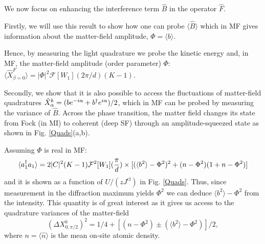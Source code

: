 We now focus on enhancing the interference term $\hat{B}$ in the
operator $\hat{F}$. 

Firstly, we will use this result to show how one can probe
$\langle \hat{B} \rangle$ which in MF gives information about the
matter-field amplitude, $\Phi = \langle b \rangle$. 

Hence, by measuring the light quadrature we probe the kinetic energy
and, in MF, the matter-field amplitude (order parameter) $\Phi$:
$\langle \hat{X}^F_{\beta=0} \rangle = | \Phi |^2
\mathcal{F}[W_1](2\pi/d) (K-1)$.

Secondly, we show that it is also possible to access the fluctuations
of matter-field quadratures $\hat{X}^b_\alpha = (b e^{-i\alpha} + b^\dagger
e^{i\alpha})/2$, which in MF can be probed by measuring the variance
of $\hat{B}$. Across the phase transition, the matter field changes
its state from Fock (in MI) to coherent (deep SF) through an
amplitude-squeezed state as shown in Fig. \ref{Quads}(a,b). 

Assuming $\Phi$ is real in MF:
\begin{equation}
  \label{intensity} 
  \langle a^\dagger_1 a_1 \rangle = 2 |C|^2(K-1)\mathcal{F}^2[W_1](\frac{\pi}{d})
  \times [ ( \langle b^2 \rangle - \Phi^2 )^2 + ( n - \Phi^2 ) ( 1 +n - \Phi^2 ) ]
\end{equation} 
and it is shown as a function of $U/(zJ^\text{cl})$ in
Fig. \ref{Quads}. Thus, since measurement in the diffraction maximum
yields $\Phi^2$ we can deduce $\langle b^2 \rangle - \Phi^2$ from the
intensity. This quantity is of great interest as it gives us access to
the quadrature variances of the matter-field
\begin{equation} 
  (\Delta X^b_{0,\pi/2})^2 = 1/4 + [(n - \Phi^2) \pm
  (\langle b^2 \rangle - \Phi^2)]/2,
\end{equation} 
where $n=\langle\hat{n}\rangle$ is the mean on-site atomic density.

